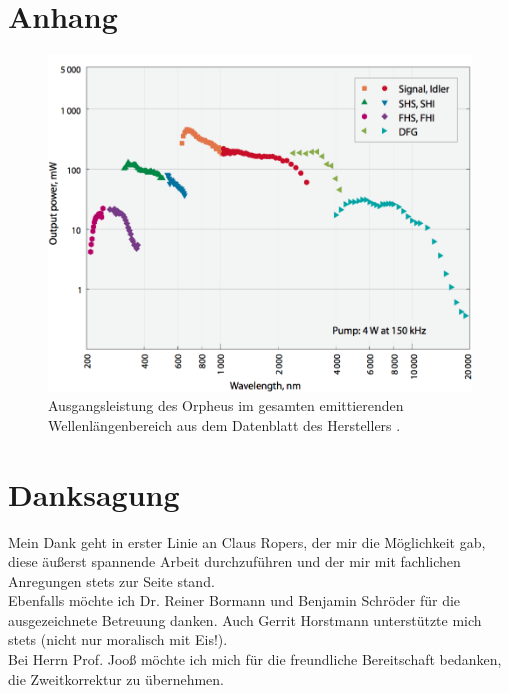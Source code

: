 \documentclass[bachelor,       %
               twoside,        %
               BCOR10mm,       %
               english,ngerman, %
               ]{GAUBM}
\begin{document}
\chapter{Anhang}
\begin{figure}[h]
	\centering
	\includegraphics[width=0.7\linewidth]{Orpheus_Tuning_Curve}
	\caption{Ausgangsleistung des Orpheus im gesamten emittierenden Wellenlängenbereich aus dem Datenblatt des Herstellers \protect\footnotemark.}
	\label{fig:orpheus_tuningcurve}
\end{figure}

\cleardoublepage


\chapter*{Danksagung}
Mein Dank geht in erster Linie an Claus Ropers, der mir die Möglichkeit gab, diese äußerst spannende Arbeit durchzuführen und der mir mit fachlichen Anregungen stets zur Seite stand.\\

Ebenfalls möchte ich Dr. Reiner Bormann und Benjamin Schröder für die ausgezeichnete Betreuung danken.
Auch Gerrit Horstmann unterstützte mich stets (nicht nur moralisch mit Eis!).\\

Bei Herrn Prof. Jooß möchte ich mich für die freundliche Bereitschaft bedanken, die Zweitkorrektur zu übernehmen.\\
\end{document}
